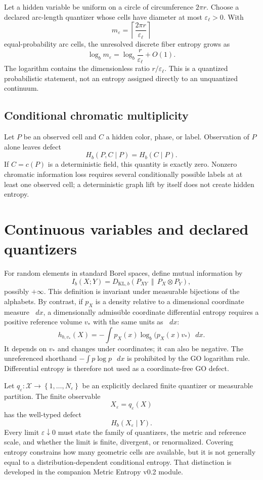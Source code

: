 \documentclass[11pt,a4paper]{article}
\theoremstyle{definition}
\theoremstyle{plain}
\theoremstyle{remark}
\newcommand{\X}{\mathcal{X}}
\newcommand{\dd}{\mathop{}\!d}
\newcommand{\1}{\mathbf{1}}
\newcommand{\KLb}{D_{\mathrm{KL},b}}
\newcommand{\Hb}{H_b}
\newcommand{\Ib}{I_b}
\newcommand{\set}[1]{\left\{#1\right\}}
\begin{document}
Let a hidden variable be uniform on a circle of circumference $2\pi r$.
Choose a declared arc-length quantizer whose cells have diameter at most
$\varepsilon_\ell>0$. With
\[
m_\varepsilon
=
\left\lceil\frac{2\pi r}{\varepsilon_\ell}\right\rceil
\]
equal-probability arc cells, the unresolved discrete
fiber entropy grows as
\[
\log_b m_\varepsilon
=
\log_b\frac{r}{\varepsilon_\ell}+O(1).
\]
The logarithm contains the dimensionless ratio $r/\varepsilon_\ell$.
This is a quantized probabilistic statement, not an entropy assigned
directly to an unquantized continuum.

\subsection{Conditional chromatic multiplicity}

Let $P$ be an observed cell and $C$ a hidden color, phase, or label.
Observation of $P$ alone leaves defect
\[
\Hb(P,C\mid P)=\Hb(C\mid P).
\]
If $C=c(P)$ is a deterministic field, this quantity is exactly zero.
Nonzero chromatic information loss requires several conditionally possible
labels at at least one observed cell; a deterministic graph lift by itself
does not create hidden entropy.

\section{Continuous variables and declared quantizers}

For random elements in standard Borel spaces, define mutual information by
\[
\Ib(X;Y)
=
\KLb\!\left(P_{XY}\,\middle\Vert\,P_X\otimes P_Y\right),
\]
possibly $+\infty$. This definition is invariant under measurable
bijections of the alphabets. By contrast, if $p_X$ is a density relative
to a dimensional coordinate measure $\dd x$, a dimensionally admissible
coordinate differential entropy requires a positive reference volume
$v_*$ with the same units as $\dd x$:
\[
h_{b,v_*}(X)
=
-\int p_X(x)\log_b\!\bigl(p_X(x)v_*\bigr)\,\dd x.
\]
It depends on $v_*$ and changes under coordinates; it can also be negative.
The unreferenced shorthand $-\int p\log p\,\dd x$ is prohibited by the
GO logarithm rule. Differential entropy is therefore not used as a
coordinate-free GO defect.

Let $q_\varepsilon:\X\to\set{1,\ldots,N_\varepsilon}$ be an explicitly
declared finite quantizer or measurable partition. The finite observable
\[
X_\varepsilon=q_\varepsilon(X)
\]
has the well-typed defect
\[
\Hb(X_\varepsilon\mid Y).
\]
Every limit $\varepsilon\downarrow0$ must state the family of quantizers,
the metric and reference scale, and whether the limit is finite, divergent,
or renormalized. Covering entropy constrains how many geometric cells are
available, but it is not generally equal to a distribution-dependent
conditional entropy. That distinction is developed in the companion
Metric Entropy v0.2 module.
\end{document}
